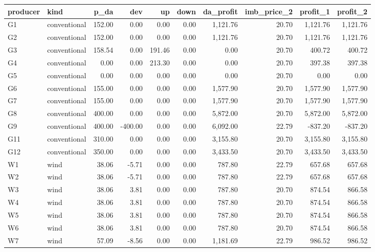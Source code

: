 \begin{tabular}{llrrrrrrrr}
\toprule
producer & kind & p\_da & dev & up & down & da\_profit & imb\_price\_2 & profit\_1 & profit\_2 \\
\midrule
G1 & conventional & 152.00 & 0.00 & 0.00 & 0.00 & 1,121.76 & 20.70 & 1,121.76 & 1,121.76 \\
G2 & conventional & 152.00 & 0.00 & 0.00 & 0.00 & 1,121.76 & 20.70 & 1,121.76 & 1,121.76 \\
G3 & conventional & 158.54 & 0.00 & 191.46 & 0.00 & 0.00 & 20.70 & 400.72 & 400.72 \\
G4 & conventional & 0.00 & 0.00 & 213.30 & 0.00 & 0.00 & 20.70 & 397.38 & 397.38 \\
G5 & conventional & 0.00 & 0.00 & 0.00 & 0.00 & 0.00 & 20.70 & 0.00 & 0.00 \\
G6 & conventional & 155.00 & 0.00 & 0.00 & 0.00 & 1,577.90 & 20.70 & 1,577.90 & 1,577.90 \\
G7 & conventional & 155.00 & 0.00 & 0.00 & 0.00 & 1,577.90 & 20.70 & 1,577.90 & 1,577.90 \\
G8 & conventional & 400.00 & 0.00 & 0.00 & 0.00 & 5,872.00 & 20.70 & 5,872.00 & 5,872.00 \\
G9 & conventional & 400.00 & -400.00 & 0.00 & 0.00 & 6,092.00 & 22.79 & -837.20 & -837.20 \\
G11 & conventional & 310.00 & 0.00 & 0.00 & 0.00 & 3,155.80 & 20.70 & 3,155.80 & 3,155.80 \\
G12 & conventional & 350.00 & 0.00 & 0.00 & 0.00 & 3,433.50 & 20.70 & 3,433.50 & 3,433.50 \\
W1 & wind & 38.06 & -5.71 & 0.00 & 0.00 & 787.80 & 22.79 & 657.68 & 657.68 \\
W2 & wind & 38.06 & -5.71 & 0.00 & 0.00 & 787.80 & 22.79 & 657.68 & 657.68 \\
W3 & wind & 38.06 & 3.81 & 0.00 & 0.00 & 787.80 & 20.70 & 874.54 & 866.58 \\
W4 & wind & 38.06 & 3.81 & 0.00 & 0.00 & 787.80 & 20.70 & 874.54 & 866.58 \\
W5 & wind & 38.06 & 3.81 & 0.00 & 0.00 & 787.80 & 20.70 & 874.54 & 866.58 \\
W6 & wind & 38.06 & 3.81 & 0.00 & 0.00 & 787.80 & 20.70 & 874.54 & 866.58 \\
W7 & wind & 57.09 & -8.56 & 0.00 & 0.00 & 1,181.69 & 22.79 & 986.52 & 986.52 \\
\bottomrule
\end{tabular}
